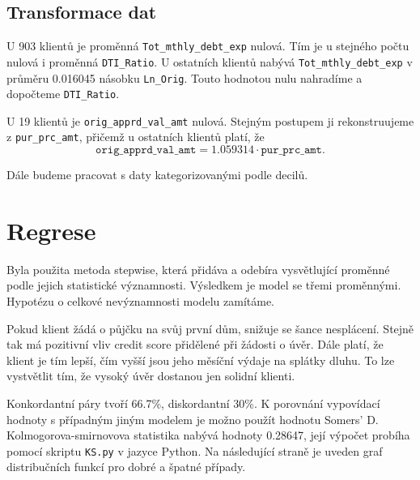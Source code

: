 \documentclass[a4paper,12pt]{article}
\begin{document}
  \subsection{Transformace dat}
    U 903 klientů je proměnná \texttt{Tot\_mthly\_debt\_exp} nulová. Tím je u stejného počtu nulová i proměnná \texttt{DTI\_Ratio}. U ostatních klientů nabývá \texttt{Tot\_mthly\_debt\_exp} v průměru 0.016045 násobku \texttt{Ln\_Orig}. Touto hodnotou nulu nahradíme a dopočteme \texttt{DTI\_Ratio}.
    
    U 19 klientů je \texttt{orig\_apprd\_val\_amt} nulová. Stejným postupem ji rekonstruujeme z \texttt{pur\_prc\_amt}, přičemž u ostatních klientů platí, že \[
    \texttt{orig\_apprd\_val\_amt} =  1.059314\cdot \texttt{pur\_prc\_amt}.
\]

	Dále budeme pracovat s daty kategorizovanými podle decilů.
  \section{Regrese}
	
	Byla použita metoda stepwise, která přidáva a odebíra vysvětlující proměnné podle jejich statistické významnosti. Výsledkem je model se třemi proměnnými. Hypotézu o celkové nevýznamnosti modelu zamítáme. 
	
	Pokud klient žádá o půjčku na svůj první dům, snižuje se šance nesplácení. Stejně tak má pozitivní vliv credit score přidělené při žádosti o úvěr. Dále platí, že klient je tím lepší, čím vyšší jsou jeho měsíční výdaje na splátky dluhu. To lze vystvětlit tím, že vysoký úvěr dostanou jen solidní klienti.
	
    Konkordantní páry tvoří 66.7\%, diskordantní 30\%.  K porovnání vypovídací hodnoty s případným jiným modelem je možno použít hodnotu Somers' D. Kolmogorova-smirnovova statistika nabývá hodnoty 0.28647, její výpočet probíha pomocí skriptu \texttt{KS.py} v jazyce Python. Na následující straně je uveden graf distribučních funkcí pro dobré a špatné případy.
    
  	
\end{document}
